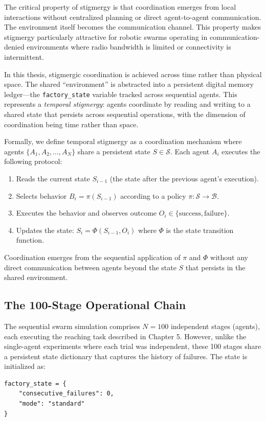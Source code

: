 \documentclass[12pt,a4paper,oneside]{report}
\begin{document}
The critical property of stigmergy is that coordination emerges from local interactions without centralized planning or direct agent-to-agent communication. The environment itself becomes the communication channel. This property makes stigmergy particularly attractive for robotic swarms operating in communication-denied environments where radio bandwidth is limited or connectivity is intermittent.

In this thesis, stigmergic coordination is achieved across time rather than physical space. The shared ``environment'' is abstracted into a persistent digital memory ledger---the \texttt{factory\_state} variable tracked across sequential agents. This represents a \textit{temporal stigmergy}: agents coordinate by reading and writing to a shared state that persists across sequential operations, with the dimension of coordination being time rather than space.

Formally, we define temporal stigmergy as a coordination mechanism where agents $\{A_1, A_2, \ldots, A_N\}$ share a persistent state $S \in \mathcal{S}$. Each agent $A_i$ executes the following protocol:
\begin{enumerate}
    \item Reads the current state $S_{i-1}$ (the state after the previous agent's execution).
    \item Selects behavior $B_i = \pi(S_{i-1})$ according to a policy $\pi: \mathcal{S} \rightarrow \mathcal{B}$.
    \item Executes the behavior and observes outcome $O_i \in \{\text{success}, \text{failure}\}$.
    \item Updates the state: $S_i = \Phi(S_{i-1}, O_i)$ where $\Phi$ is the state transition function.
\end{enumerate}
Coordination emerges from the sequential application of $\pi$ and $\Phi$ without any direct communication between agents beyond the state $S$ that persists in the shared environment.

\subsection{The 100-Stage Operational Chain}

The sequential swarm simulation comprises $N = 100$ independent stages (agents), each executing the reaching task described in Chapter 5. However, unlike the single-agent experiments where each trial was independent, these 100 stages share a persistent state dictionary that captures the history of failures. The state is initialized as:
\begin{verbatim}
factory_state = {
    "consecutive_failures": 0,
    "mode": "standard"
}
\end{verbatim}
\end{document}
